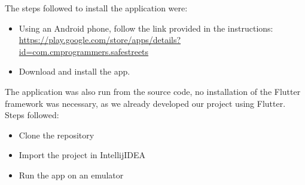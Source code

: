 The steps followed to install the application were:
\begin{itemize}
    \item 
    Using an Android phone, follow the link provided in the instructions: \url{https://play.google.com/store/apps/details?id=com.cmprogrammers.safestreets}
    \item
    Download and install the app.
\end{itemize}

The application was also run from the source code, no installation of the Flutter framework was necessary, as we already developed our project using Flutter. Steps followed:
\begin{itemize}
    \item 
    Clone the repository
    \item
    Import the project in IntellijIDEA
    \item
    Run the app on an emulator
\end{itemize}
